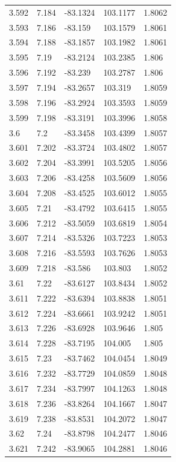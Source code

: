 \begin{tabular}{lllll}
3.592 & 7.184 & -83.1324 & 103.1177 & 1.8062 \\
3.593 & 7.186 & -83.159 & 103.1579 & 1.8061 \\
3.594 & 7.188 & -83.1857 & 103.1982 & 1.8061 \\
3.595 & 7.19 & -83.2124 & 103.2385 & 1.806 \\
3.596 & 7.192 & -83.239 & 103.2787 & 1.806 \\
3.597 & 7.194 & -83.2657 & 103.319 & 1.8059 \\
3.598 & 7.196 & -83.2924 & 103.3593 & 1.8059 \\
3.599 & 7.198 & -83.3191 & 103.3996 & 1.8058 \\
3.6 & 7.2 & -83.3458 & 103.4399 & 1.8057 \\
3.601 & 7.202 & -83.3724 & 103.4802 & 1.8057 \\
3.602 & 7.204 & -83.3991 & 103.5205 & 1.8056 \\
3.603 & 7.206 & -83.4258 & 103.5609 & 1.8056 \\
3.604 & 7.208 & -83.4525 & 103.6012 & 1.8055 \\
3.605 & 7.21 & -83.4792 & 103.6415 & 1.8055 \\
3.606 & 7.212 & -83.5059 & 103.6819 & 1.8054 \\
3.607 & 7.214 & -83.5326 & 103.7223 & 1.8053 \\
3.608 & 7.216 & -83.5593 & 103.7626 & 1.8053 \\
3.609 & 7.218 & -83.586 & 103.803 & 1.8052 \\
3.61 & 7.22 & -83.6127 & 103.8434 & 1.8052 \\
3.611 & 7.222 & -83.6394 & 103.8838 & 1.8051 \\
3.612 & 7.224 & -83.6661 & 103.9242 & 1.8051 \\
3.613 & 7.226 & -83.6928 & 103.9646 & 1.805 \\
3.614 & 7.228 & -83.7195 & 104.005 & 1.805 \\
3.615 & 7.23 & -83.7462 & 104.0454 & 1.8049 \\
3.616 & 7.232 & -83.7729 & 104.0859 & 1.8048 \\
3.617 & 7.234 & -83.7997 & 104.1263 & 1.8048 \\
3.618 & 7.236 & -83.8264 & 104.1667 & 1.8047 \\
3.619 & 7.238 & -83.8531 & 104.2072 & 1.8047 \\
3.62 & 7.24 & -83.8798 & 104.2477 & 1.8046 \\
3.621 & 7.242 & -83.9065 & 104.2881 & 1.8046 \\

\end{tabular}

